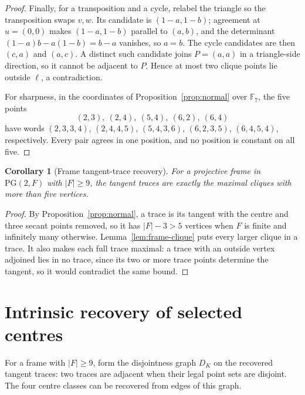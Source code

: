 \documentclass[11pt]{article}
\newtheorem{corollary}[theorem]{Corollary}
\theoremstyle{definition}
\theoremstyle{remark}
\newcommand{\F}{\mathbb F}
\newcommand{\PG}{\mathrm{PG}}
\begin{document}
\begin{proof}
Finally, for a transposition and a cycle, relabel the triangle so the
transposition swaps $v,w$. Its candidate is $(1-a,1-b)$; agreement at
$u=(0,0)$ makes $(1-a,1-b)$ parallel to $(a,b)$, and the determinant
$(1-a)b-a(1-b)=b-a$ vanishes, so $a=b$. The cycle candidates are then $(c,a)$ and $(a,c)$.
A distinct such candidate joins $P=(a,a)$ in a triangle-side direction,
so it cannot be adjacent to $P$. Hence at most two clique points lie
outside $\ell$, a contradiction.

For sharpness, in the coordinates of Proposition~\ref{prop:normal} over
$\F_7$, the five points
\[
 (2,3),\ (2,4),\ (5,4),\ (6,2),\ (6,4)
\]
have words $(2,3,3,4)$, $(2,4,4,5)$, $(5,4,3,6)$,
$(6,2,3,5)$, $(6,4,5,4)$, respectively. Every pair agrees in one position,
and no position is constant on all five.
\end{proof}

\begin{corollary}[Frame tangent-trace recovery]\label{cor:frame-traces}
For a projective frame in $\PG(2,F)$ with $|F|\ge9$, the tangent traces
are exactly the maximal cliques with more than five vertices.
\end{corollary}
\begin{proof}
By Proposition~\ref{prop:normal}, a trace is its tangent with the centre
and three secant points removed, so it has $|F|-3>5$ vertices when $F$
is finite and infinitely many otherwise.
Lemma~\ref{lem:frame-clique} puts every larger clique in a trace.
It also makes each full trace maximal: a trace with an outside vertex
adjoined lies in no trace, since its two or more trace points determine
the tangent, so it would contradict the same bound.
\end{proof}

\section{Intrinsic recovery of selected centres}
\label{sec:centres}

For a frame with $|F|\ge9$, form the disjointness graph $D_K$ on the
recovered tangent traces: two traces are adjacent when their legal point
sets are disjoint. The four centre classes can be recovered from edges
of this graph.
\end{document}
